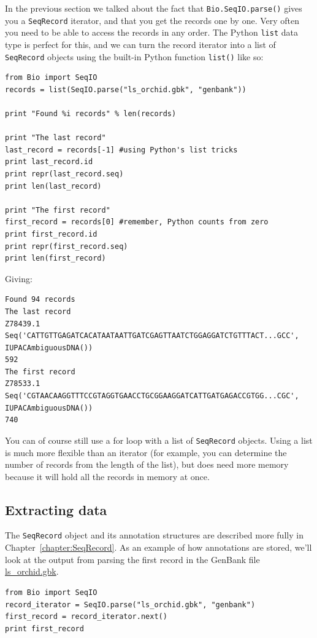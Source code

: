 \documentclass{report}
\begin{document}
In the previous section we talked about the fact that \verb|Bio.SeqIO.parse()| gives you a \verb|SeqRecord| iterator, and that you get the records one by one.  Very often you need to be able to access the records in any order. The Python \verb|list| data type is perfect for this, and we can turn the record iterator into a list of \verb|SeqRecord| objects using the built-in Python function \verb|list()| like so:

\begin{verbatim}
from Bio import SeqIO
records = list(SeqIO.parse("ls_orchid.gbk", "genbank"))

print "Found %i records" % len(records)

print "The last record"
last_record = records[-1] #using Python's list tricks
print last_record.id
print repr(last_record.seq)
print len(last_record)

print "The first record"
first_record = records[0] #remember, Python counts from zero
print first_record.id
print repr(first_record.seq)
print len(first_record)
\end{verbatim}

\noindent Giving:

\begin{verbatim}
Found 94 records
The last record
Z78439.1
Seq('CATTGTTGAGATCACATAATAATTGATCGAGTTAATCTGGAGGATCTGTTTACT...GCC', IUPACAmbiguousDNA())
592
The first record
Z78533.1
Seq('CGTAACAAGGTTTCCGTAGGTGAACCTGCGGAAGGATCATTGATGAGACCGTGG...CGC', IUPACAmbiguousDNA())
740
\end{verbatim}

You can of course still use a for loop with a list of \verb|SeqRecord| objects.  Using a list is much more flexible than an iterator (for example, you can determine the number of records from the length of the list), but does need more memory because it will hold all the records in memory at once.

\subsection{Extracting data}

The \verb|SeqRecord| object and its annotation structures are described more fully in
Chapter~\ref{chapter:SeqRecord}.  As an example of how annotations are stored, we'll look at the output from parsing the first record in the GenBank file \href{http://biopython.org/DIST/docs/tutorial/examples/ls_orchid.gbk}{ls\_orchid.gbk}.

\begin{verbatim}
from Bio import SeqIO
record_iterator = SeqIO.parse("ls_orchid.gbk", "genbank")
first_record = record_iterator.next()
print first_record
\end{verbatim}
\end{document}
